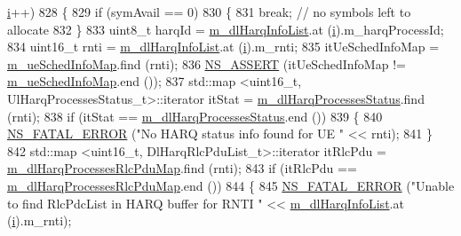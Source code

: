 \begin{DoxyCode}
      \hyperlink{bernuolliDistribution_8m_a6f6ccfcf58b31cb6412107d9d5281426}{i}++)
828                 \{
829                         \textcolor{keywordflow}{if} (symAvail == 0)
830                         \{
831                                 \textcolor{keywordflow}{break};  \textcolor{comment}{// no symbols left to allocate}
832                         \}
833                         uint8\_t harqId = \hyperlink{classns3_1_1MmWaveFlexTtiPfMacScheduler_a71cf056c010c970921c28871ed145af0}{m\_dlHarqInfoList}.at (\hyperlink{bernuolliDistribution_8m_a6f6ccfcf58b31cb6412107d9d5281426}{i}).m\_harqProcessId;
834                         uint16\_t rnti = \hyperlink{classns3_1_1MmWaveFlexTtiPfMacScheduler_a71cf056c010c970921c28871ed145af0}{m\_dlHarqInfoList}.at (\hyperlink{bernuolliDistribution_8m_a6f6ccfcf58b31cb6412107d9d5281426}{i}).m\_rnti;
835                         itUeSchedInfoMap = \hyperlink{classns3_1_1MmWaveFlexTtiPfMacScheduler_a3b6dd19d8156d24c8d30cc562843b740}{m\_ueSchedInfoMap}.find (rnti);
836                         \hyperlink{assert_8h_a6dccdb0de9b252f60088ce281c49d052}{NS\_ASSERT} (itUeSchedInfoMap != \hyperlink{classns3_1_1MmWaveFlexTtiPfMacScheduler_a3b6dd19d8156d24c8d30cc562843b740}{m\_ueSchedInfoMap}.end ());
837                         std::map <uint16\_t, UlHarqProcessesStatus\_t>::iterator itStat = 
      \hyperlink{classns3_1_1MmWaveFlexTtiPfMacScheduler_ac8fbe1bcc35d738ae7944797590909fc}{m\_dlHarqProcessesStatus}.find (rnti);
838                         \textcolor{keywordflow}{if} (itStat == \hyperlink{classns3_1_1MmWaveFlexTtiPfMacScheduler_ac8fbe1bcc35d738ae7944797590909fc}{m\_dlHarqProcessesStatus}.end ())
839                         \{
840                                 \hyperlink{group__fatal_ga5131d5e3f75d7d4cbfd706ac456fdc85}{NS\_FATAL\_ERROR} (\textcolor{stringliteral}{"No HARQ status info found for UE "} << rnti);
841                         \}
842                         std::map <uint16\_t, DlHarqRlcPduList\_t>::iterator itRlcPdu =  
      \hyperlink{classns3_1_1MmWaveFlexTtiPfMacScheduler_a9a0027a79dee0a60f04e55c25efb7ab7}{m\_dlHarqProcessesRlcPduMap}.find (rnti);
843                         \textcolor{keywordflow}{if} (itRlcPdu == \hyperlink{classns3_1_1MmWaveFlexTtiPfMacScheduler_a9a0027a79dee0a60f04e55c25efb7ab7}{m\_dlHarqProcessesRlcPduMap}.end ())
844                         \{
845                                 \hyperlink{group__fatal_ga5131d5e3f75d7d4cbfd706ac456fdc85}{NS\_FATAL\_ERROR} (\textcolor{stringliteral}{"Unable to find RlcPdcList in HARQ buffer for
       RNTI "} << \hyperlink{classns3_1_1MmWaveFlexTtiPfMacScheduler_a71cf056c010c970921c28871ed145af0}{m\_dlHarqInfoList}.at (\hyperlink{bernuolliDistribution_8m_a6f6ccfcf58b31cb6412107d9d5281426}{i}).m\_rnti);

\end{DoxyCode}
